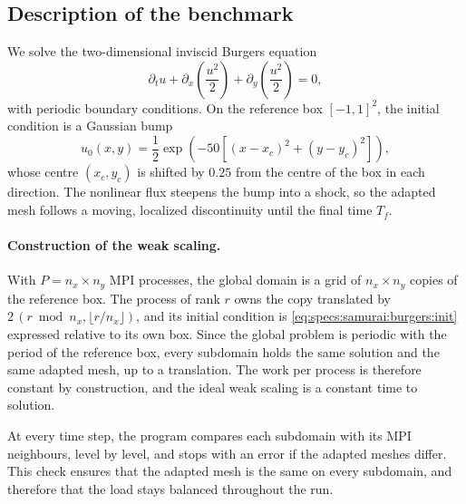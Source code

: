 

\subsection{Description of the benchmark}

We solve the two-dimensional inviscid Burgers equation
\begin{equation}\label{eq:specs:samurai:burgers}
  \partial_t u + \partial_x \left(\frac{u^2}{2}\right) + \partial_y \left(\frac{u^2}{2}\right) = 0,
\end{equation}
with periodic boundary conditions. On the reference box $[-1,1]^2$, the
initial condition is a Gaussian bump
\begin{equation}\label{eq:specs:samurai:burgers:init}
  u_0(x,y) = \frac{1}{2} \exp\left(-50\left[(x-x_c)^2 + (y-y_c)^2\right]\right),
\end{equation}
whose centre $(x_c, y_c)$ is shifted by $0.25$ from the centre of the box in
each direction. The nonlinear flux steepens the bump into a shock, so the
adapted mesh follows a moving, localized discontinuity until the final time
$T_f$.

\paragraph{Construction of the weak scaling.}
With $P = n_x \times n_y$ MPI processes, the global domain is a grid of
$n_x \times n_y$ copies of the reference box. The process of rank $r$ owns the
copy translated by $2\,(r \bmod n_x, \lfloor r / n_x \rfloor)$, and its
initial condition is \eqref{eq:specs:samurai:burgers:init} expressed relative
to its own box. Since the global problem is periodic with the period of the
reference box, every subdomain holds the same solution and the same adapted
mesh, up to a translation. The work per process is therefore constant by
construction, and the ideal weak scaling is a constant time to solution.

At every time step, the program compares each subdomain with its MPI neighbours,
level by level, and stops with an error if the adapted meshes differ. This
check ensures that the adapted mesh is the same on every subdomain, and
therefore that the load stays balanced throughout the run.


